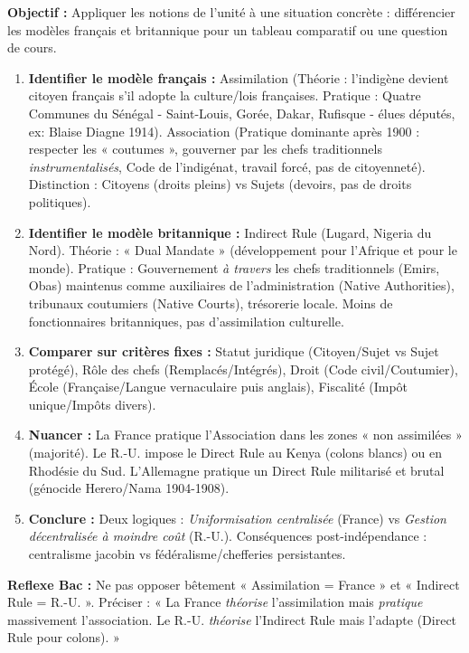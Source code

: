 \documentclass[11pt]{article}
\newcommand{\cle}[1]{{\popxbold\color{popdark}#1}}
\begin{document}
\begin{methode}
\textbf{Objectif :} Appliquer les notions de l'unité à une situation concrète : différencier les modèles français et britannique pour un tableau comparatif ou une question de cours.
\begin{enumerate}
    \item \textbf{Identifier le modèle français :} \cle{Assimilation} (Théorie : l'indigène devient citoyen français s'il adopte la culture/lois françaises. Pratique : \cle{Quatre Communes} du Sénégal - Saint-Louis, Gorée, Dakar, Rufisque - élues députés, ex: Blaise Diagne 1914). \cle{Association} (Pratique dominante après 1900 : respecter les « coutumes », gouverner par les chefs traditionnels \emph{instrumentalisés}, Code de l'indigénat, travail forcé, pas de citoyenneté). Distinction : \cle{Citoyens} (droits pleins) vs \cle{Sujets} (devoirs, pas de droits politiques).
    \item \textbf{Identifier le modèle britannique :} \cle{Indirect Rule} (Lugard, Nigeria du Nord). Théorie : « Dual Mandate » (développement pour l'Afrique et pour le monde). Pratique : Gouvernement \emph{à travers} les \cle{chefs traditionnels} (Emirs, Obas) maintenus comme auxiliaires de l'administration (Native Authorities), tribunaux coutumiers (Native Courts), trésorerie locale. Moins de fonctionnaires britanniques, pas d'assimilation culturelle.
    \item \textbf{Comparer sur critères fixes :} Statut juridique (Citoyen/Sujet vs Sujet protégé), Rôle des chefs (Remplacés/Intégrés), Droit (Code civil/Coutumier), École (Française/Langue vernaculaire puis anglais), Fiscalité (Impôt unique/Impôts divers).
    \item \textbf{Nuancer :} La France pratique l'Association dans les zones « non assimilées » (majorité). Le R.-U. impose le \cle{Direct Rule} au Kenya (colons blancs) ou en Rhodésie du Sud. L'Allemagne pratique un \cle{Direct Rule} militarisé et brutal (génocide Herero/Nama 1904-1908).
    \item \textbf{Conclure :} Deux logiques : \emph{Uniformisation centralisée} (France) vs \emph{Gestion décentralisée à moindre coût} (R.-U.). Conséquences post-indépendance : centralisme jacobin vs fédéralisme/chefferies persistantes.
\end{enumerate}
\textbf{Reflexe Bac :} Ne pas opposer bêtement « Assimilation = France » et « Indirect Rule = R.-U. ». Préciser : « La France \emph{théorise} l'assimilation mais \emph{pratique} massivement l'association. Le R.-U. \emph{théorise} l'Indirect Rule mais l'adapte (Direct Rule pour colons). »
\end{methode}
\end{document}
